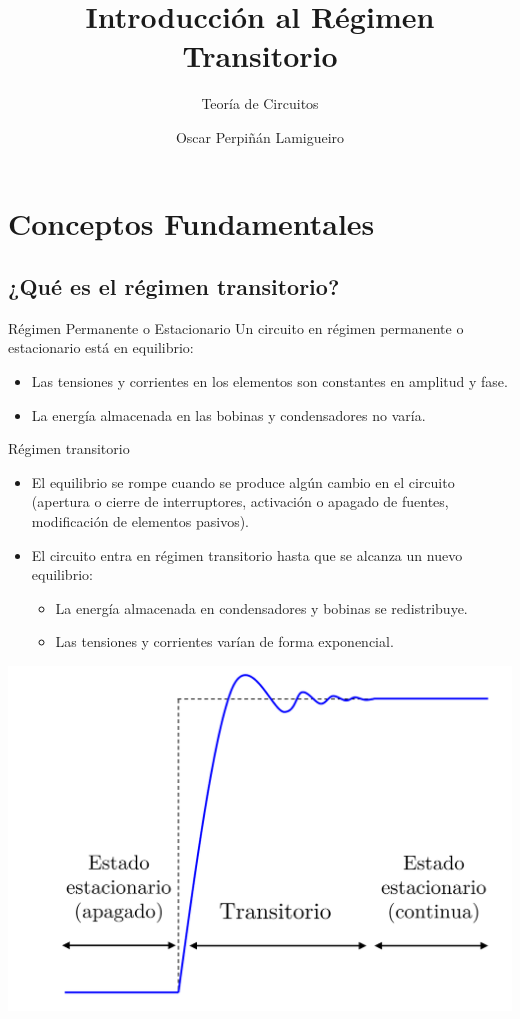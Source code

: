 \documentclass[aspectratio=169, usenames,svgnames,dvipsnames]{beamer}
\author{Oscar Perpiñán Lamigueiro}
\date{}
\title{Introducción al Régimen Transitorio}
\subtitle{Teoría de Circuitos}
\begin{document}
\maketitle
\section{Conceptos Fundamentales}
\label{sec:orga366b93}

\subsection{¿Qué es el régimen transitorio?}
\label{sec:org93b492b}
\begin{frame}[label={sec:orgbe5842e}]{Régimen Permanente o Estacionario}
Un circuito en régimen permanente o estacionario está en equilibrio:
\begin{itemize}
\item Las tensiones y corrientes en los elementos son constantes en amplitud y fase.
\item La energía almacenada en las bobinas y condensadores no varía.
\end{itemize}
\end{frame}
\begin{frame}[label={sec:org0b010a9}]{Régimen transitorio}
\begin{itemize}
\item El equilibrio se rompe cuando se produce algún cambio en el circuito (apertura o cierre de interruptores, activación o apagado de fuentes, modificación de elementos pasivos).
\item El circuito entra en régimen transitorio hasta que se alcanza un nuevo equilibrio:
\begin{itemize}
\item La energía almacenada en condensadores y bobinas se redistribuye.
\item Las tensiones y corrientes varían de forma exponencial.
\end{itemize}
\end{itemize}

\begin{center}
\includegraphics[height=0.55\textheight]{../figs/ej_transitorio_DC.png}
\end{center}
\end{frame}
\end{document}

